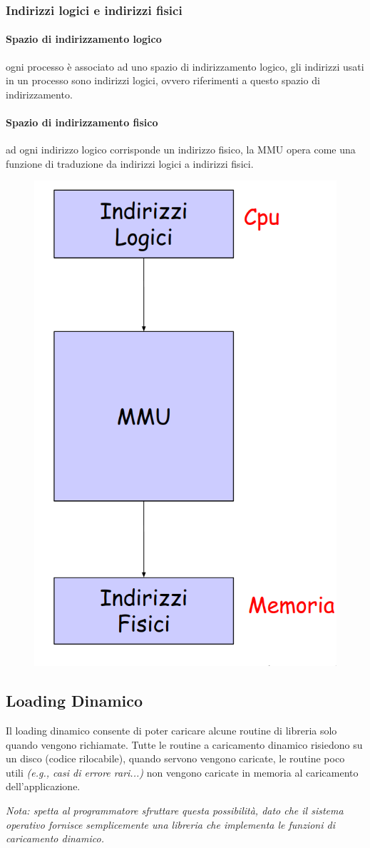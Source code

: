 \subsubsection{Indirizzi logici e indirizzi fisici}

\paragraph{Spazio di indirizzamento logico} ogni processo è associato ad uno spazio di indirizzamento logico, gli indirizzi usati in un processo sono indirizzi logici, ovvero riferimenti a
questo spazio di indirizzamento.

\paragraph{Spazio di indirizzamento fisico} ad ogni indirizzo logico corrisponde un indirizzo fisico, la MMU opera come una funzione di traduzione da indirizzi logici a indirizzi fisici.

\begin{figure} [h]
    \centering
    \includegraphics[width=0.25\linewidth]{Images/Screenshot 2025-01-16 at 18-40-39 so-05-memoria - so-05-memoria.pdf.png}
\end{figure}

\subsection{Loading Dinamico}
Il loading dinamico consente di poter caricare alcune routine di libreria solo quando vengono richiamate.
Tutte le routine a caricamento dinamico risiedono su un disco (codice rilocabile), quando servono vengono caricate, le routine poco utili \textit{(e.g., casi di errore rari...)} non vengono caricate in
memoria al caricamento dell'applicazione.

\textit{Nota: spetta al programmatore sfruttare questa possibilità, dato che il sistema operativo fornisce semplicemente una libreria che implementa le funzioni di caricamento dinamico.}


